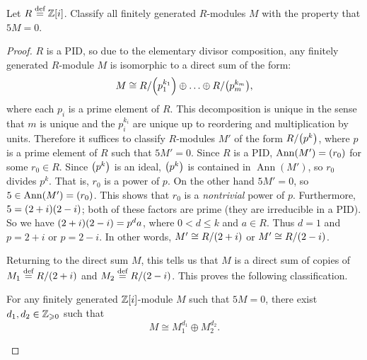 \documentclass{./typewriter-math}
\DeclareMathOperator\Ann{Ann}
\begin{document}
	\begin{exercise}
		Let \(R \overset{\normalfont{\text{def}}}{=} \mathbb{Z}{\left[i\right]}\). Classify all finitely generated \(R\)-modules
		\(M\) with the property that \(5M = 0\).

		\begin{proof}
			\(R\) is a PID, so due to the elementary divisor composition, any finitely
			generated \(R\)-module \(M\) is isomorphic to a direct sum of the form:%
			\[%
				M \cong R/\pwrap{p_1^{k_1}} \oplus \ldots \oplus R/\pwrap{p_m^{k_m}},
			\]%
			where each \(p_i\) is a prime element of \(R\). This decomposition is
			unique in the sense that \(m\) is unique and the \(p_i^{k_i}\) are unique
			up to reordering and multiplication by units. Therefore it suffices to
			classify \(R\)-modules \(M'\) of the form \(R/{\left(p^k\right)}\), where \(p\)
			is a prime element of \(R\) such that \(5 M' = 0\). Since \(R\) is a PID,
			\(\Ann(M') = \pwrap{r_0}\) for some \(r_0 \in R\). Since \({\left(p^k\right)}\)
			is an ideal, \({\left(p^k\right)}\) is contained in \(\Ann(M')\), so \(r_0\)
			divides \(p^k\). That is, \(r_0\) is a power of \(p\). On the other hand
			\(5 M' = 0\), so \(5 \in \Ann(M') = \pwrap{r_0}\). This shows that \(r_0\)
			is a \emph{nontrivial} power of \(p\). Furthermore, \(5 =
			{\left(2+i\right)}{\left(2-i\right)}\); both of these factors are prime (they are
			irreducible in a PID). So we have \({\left(2+i\right)}{\left(2-i\right)} = p^d a\),
			where \(0 < d \leq k\) and \(a \in R\). Thus \(d = 1\) and \(p = 2+i\) or
			\(p = 2-i\). In other words, \(M' \cong R/{\left(2+i\right)}\) or \(M' \cong
			R/{\left(2-i\right)}\).
			
			Returning to the direct sum \(M\), this tells us that \(M\) is a direct
			sum of copies of \(M_1 \overset{\normalfont{\text{def}}}{=} R/{\left(2+i\right)}\) and \(M_2 \overset{\normalfont{\text{def}}}{=}
			R/{\left(2-i\right)}\). This proves the following classification.

			\begin{proposition}
				For any finitely generated \(\mathbb{Z}[i]\)-module \(M\) such that \(5 M = 0\),
				there exist \(d_1,d_2 \in \mathbb{Z}_{\geqslant 0}\)	such that%
				\[%
					M \cong M_1^{d_1} \oplus M_2^{d_2}.
				\]%
			\end{proposition}
		\end{proof}
	\end{exercise}
\end{document}
